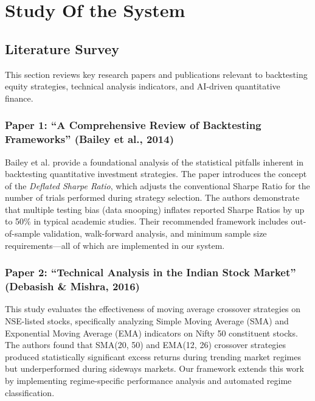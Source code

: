 
\chapter{Study Of the System} \label{chap2}

\newpage

\section{Literature Survey}

This section reviews key research papers and publications relevant to backtesting equity strategies, technical analysis indicators, and AI-driven quantitative finance.

\subsection{Paper 1: ``A Comprehensive Review of Backtesting Frameworks'' (Bailey et al., 2014) \cite{article15}}

Bailey et al. provide a foundational analysis of the statistical pitfalls inherent in backtesting quantitative investment strategies. The paper introduces the concept of the \textit{Deflated Sharpe Ratio}, which adjusts the conventional Sharpe Ratio for the number of trials performed during strategy selection. The authors demonstrate that multiple testing bias (data snooping) inflates reported Sharpe Ratios by up to 50\% in typical academic studies. Their recommended framework includes out-of-sample validation, walk-forward analysis, and minimum sample size requirements---all of which are implemented in our system.

\subsection{Paper 2: ``Technical Analysis in the Indian Stock Market'' (Debasish \& Mishra, 2016) \cite{2016}}

This study evaluates the effectiveness of moving average crossover strategies on NSE-listed stocks, specifically analyzing Simple Moving Average (SMA) and Exponential Moving Average (EMA) indicators on Nifty 50 constituent stocks. The authors found that SMA(20, 50) and EMA(12, 26) crossover strategies produced statistically significant excess returns during trending market regimes but underperformed during sideways markets. Our framework extends this work by implementing regime-specific performance analysis and automated regime classification.

